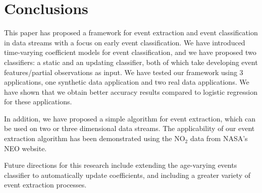 \documentclass[a4paper,11pt]{article}
\begin{document}
\section{Conclusions}\label{sec:Conclusions}

This paper has proposed a framework for event extraction and event classification in data streams with a focus on early event classification. We have introduced  time-varying coefficient models for event classification, and we have proposed two classifiers: a static and an updating classifier, both of which take developing event features/partial observations as input. We have tested our framework using 3 applications, one synthetic data application and two real data applications. We have shown that we obtain better accuracy results compared to logistic regression for these applications.

In addition, we have proposed a simple algorithm for event extraction, which can be used on two or three dimensional data streams. The applicability of our event extraction algorithm has been demonstrated using the $\text{NO}_2$ data from NASA's NEO website.

Future directions for this research include extending the age-varying events classifier to  automatically update coefficients, and including a greater variety of event extraction processes.

\end{document}
